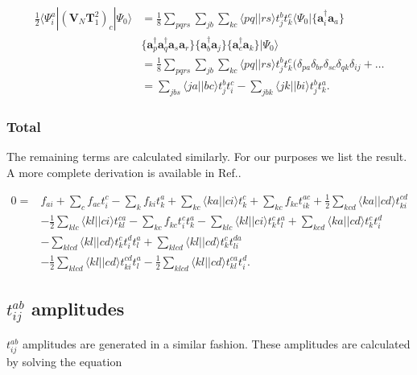 \documentclass[a4paper,norsk,11pt,twoside]{report}
\begin{document}
\begin{align}
\frac{1}{2} \langle \Psi_i^a | (\textbf{V}_N \textbf{T}_1^2)_c | \Psi_0 \rangle &
= \frac{1}{8} \sum_{pqrs} \sum_{jb} \sum_{kc} 
\langle pq || rs \rangle t_j^b t_k^c \langle \Psi_0 | 
\{ \textbf{a}^{\dag}_i \textbf{a}_a \} \nonumber \\ &
\{\textbf{a}^{\dag}_p \textbf{a}^{\dag}_q
\textbf{a}_s \textbf{a}_r \} \{\textbf{a}^{\dag}_b \textbf{a}_j \} \{\textbf{a}^{\dag}_c \textbf{a}_k \}
| \Psi_0 \rangle \nonumber \\ &
= \frac{1}{8} \sum_{pqrs} \sum_{jb} \sum_{kc} 
\langle pq || rs \rangle t_j^b t_k^c (
\delta_{pa} \delta_{br} \delta_{sc} \delta_{qk} \delta_{ij} + \dots \nonumber \\ & 
= \sum_{jbs} \langle ja || bc \rangle t_j^b t_i^c
- \sum_{jbk} \langle jk || bi \rangle t_j^b t_k^a .
\end{align}

\subsubsection{Total}
The remaining terms are calculated similarly. For our purposes we list the result. A more complete derivation is available in Ref.\cite{non_refer_numba1}.

\begin{align}
0 = & f_{ai} + \sum_c f_{ac} t_i^c - \sum_k f_{ki} t_k^a + \sum_{kc} \langle ka||ci \rangle t_k^c + \sum_{kc} f_{kc} t_{ik}^{ac} + \frac{1}{2} \sum_{kcd} \langle ka || cd \rangle t_{ki}^{cd} \label{T1equation} \\ &
- \frac{1}{2} \sum_{klc} \langle kl||ci\rangle t_{kl}^{ca} - \sum_{kc} f_{kc} t_i^c t_k^a - \sum_{klc} \langle kl || ci \rangle t_k^c t_l^a + \sum_{kcd} \langle ka||cd \rangle t_k^c t_i^d \nonumber \\ & 
- \sum_{klcd} \langle kl || cd \rangle t_k^c t_i^d t_l^a + \sum_{klcd} \langle kl||cd\rangle t_k^c t_{li}^{da} \nonumber \\ &
 - \frac{1}{2} \sum_{klcd} \langle kl || cd \rangle t_{ki}^{cd} t_l^a 
- \frac{1}{2} \sum_{klcd} \langle kl||cd \rangle t_{kl}^{ca} t_i^d . \nonumber
\end{align}

\subsection{$t_{ij}^{ab}$ amplitudes}
$t_{ij}^{ab}$ amplitudes are generated in a similar fashion. These amplitudes are calculated by solving the equation
\end{document}
